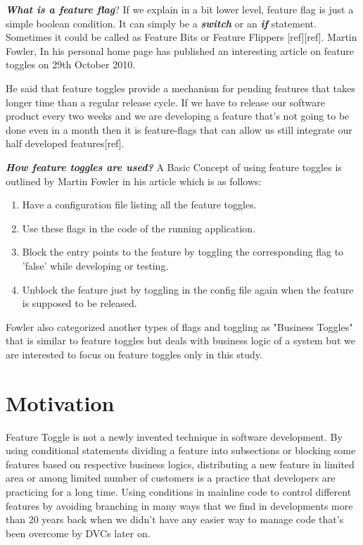 \documentclass{acm_proc_article-sp}
\begin{document}
\textit{\textbf{What is a feature flag}}? If we explain in a bit lower level, feature flag is just a simple boolean condition. It can simply be a \textit{\textbf{switch}} or an \textit{\textbf{if}} statement. Sometimes it could be called as Feature Bits or Feature Flippers [ref][ref]. Martin Fowler, In his personal home page has published an interesting article on feature toggles on 29th October 2010.

He said that feature toggles provide a mechanism for pending features that takes longer time than a regular release cycle. If we have to release our software product every two weeks and we are developing a feature that's not going to be done even in a month then it is feature-flags that can allow us still integrate our half developed features[ref].

\textit{\textbf{How feature toggles are used?}}
A Basic Concept of using feature toggles is outlined by Martin Fowler in his article which is as follows:
\renewcommand{\labelenumi}{\theenumi:}
\begin{enumerate}
\item Have a configuration file listing all the feature toggles.
\item Use these flags in the code of the running application.
\item Block the entry points to the feature by toggling the corresponding flag to 'false' while developing or testing.
\item Unblock the feature just by toggling in the config file again when the feature is supposed to be released.
\end{enumerate}

Fowler also categorized another types of flags and toggling as "Business Toggles" that is similar to feature toggles but deals with business logic of a system but we are interested to focus on feature toggles only in this study.

\section{Motivation}
Feature Toggle is not a newly invented technique in software development. By using conditional statements dividing a feature into subsections or blocking some features based on respective business logics, distributing a new feature in limited area or among limited number of customers is a practice that developers are practicing for a long time. Using conditions in mainline code to control different features by avoiding branching in many ways that we find in developments more than 20 years back when we didn't have any easier way to manage code that's been overcome by DVCs later on.
\end{document}
